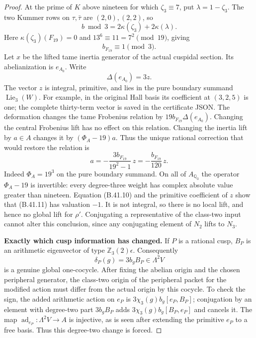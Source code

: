 \begin{proof}
At the prime of $K$ above nineteen for which
$\zeta_3\equiv7$, put $\lambda=1-\zeta_3$.  The two
Kummer rows on $\tau,\bar\tau$ are $(2,0),(2,2)$, so
\[
 b\bmod3=2\kappa(\zeta_3)+2\kappa(\lambda).
\]
Here $\kappa(\zeta_3)(F_{19})=0$ and
$13^6\equiv11=7^2\pmod {19}$, giving
\[
 b_{F_{19}}\equiv1\pmod3.                                 \tag{B.41.10}
\]
Let $x$ be the lifted tame inertia generator of the actual
cuspidal section.  Its abelianization is $e_{A_0}$.  Write
\[
 \Delta(e_{A_0})=3z.
\]
The vector $z$ is integral, primitive, and lies in the pure
boundary summand $\operatorname{Lie}_3(W)$.  For example,
in the original Hall basis its coefficient at $(3,2,5)$
is one; the complete thirty-term vector is saved in the
certificate JSON.  The deformation changes the tame
Frobenius relation by $19b_{F_{19}}\Delta(e_{A_0})$.
Changing the central Frobenius lift has no effect on this
relation.  Changing the inertia lift by $a\in A$ changes
it by $(\Phi_A-19)a$.  Thus the unique rational correction
that would restore the relation is
\[
 a=-\frac{3b_{F_{19}}}{19^2-1}\,z
   =-\frac{b_{F_{19}}}{120}\,z.                            \tag{B.41.11}
\]
Indeed $\Phi_A=19^3$ on the pure boundary summand.
On all of $A_{\mathbb Q_3}$ the operator
$\Phi_A-19$ is invertible: every degree-three weight has
complex absolute value greater than nineteen.
Equation (B.41.10) and the primitive coefficient of $z$
show that (B.41.11) has valuation $-1$.  It is not integral,
so there is no local lift, and hence no global lift for
$\rho'$.  Conjugating a representative of the class-two
input cannot alter this conclusion, since any conjugating
element of $N_2$ lifts to $N_3$.

\par\smallskip\noindent\textbf{Exactly which cusp information has changed.}\enspace
If $P$ is a rational cusp, $B_P$ is an arithmetic eigenvector
of type $\mathbb Z_3(2)\epsilon$.  Consequently
\[
 \delta_P(g)=3b_gB_P\in\Lambda^2V                         \tag{B.41.12}
\]
is a genuine global one-cocycle.  After fixing the abelian origin and the chosen peripheral
generator, the class-two origin of the peripheral packet for the modified action must differ
from the actual origin by this cocycle.  To check the sign,
the added arithmetic action on $e_P$ is
$3\chi_3(g)b_g[e_P,B_P]$; conjugation by an element with
degree-two part $3b_gB_P$ adds
$3\chi_3(g)b_g[B_P,e_P]$ and cancels it.
The map $\operatorname{ad}_{e_P}:\Lambda^2V\to A$ is
injective, as is seen after extending the primitive
$e_P$ to a free basis.  Thus this degree-two change is forced.


\end{proof}
